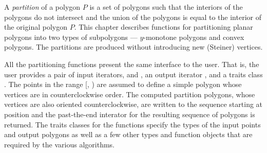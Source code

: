 A {\em partition} of a polygon $P$ is a set of 
polygons %
such that the 
interiors of the polygons do not intersect and the union of the polygons 
is equal to the interior of the original polygon $P$.  
This chapter describes functions for partitioning
planar polygons into two types of subpolygons --- $y$-monotone polygons and
convex polygons.  The partitions are produced without introducing new
(Steiner) vertices. 

All the partitioning functions present the same interface to
the user.  That is, the user provides a pair of input iterators, 
and , an output iterator ,  and a traits class 
. The points in the range [, ) are assumed
to define a simple polygon whose vertices are in counterclockwise order.
The computed partition polygons, whose vertices are also oriented 
counterclockwise, are written to the sequence starting at position
 and the past-the-end interator for the resulting sequence of
polygons is returned.  The traits classes for the functions specify the types
of the input points and output polygons as well as a few other types and
function objects that are required by the various algorithms.
